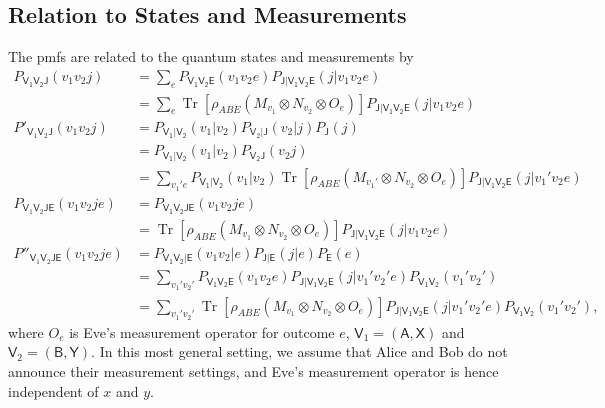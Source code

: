 \documentclass[10pt, a4paper]{article}
\numberwithin{equation}{section} %
\theoremstyle{definition}
\theoremstyle{plain}
\newcommand{\?}{\mathrel{?}} %
\newcommand{\Tr}[2][]{\mathop{\mathrm{Tr}#1}\left[ #2 \right]} %
\newcommand{\crv}[1]{\mathsf{#1}}
\begin{document}
                  \subsection{Relation to States and Measurements}\label{sec:ubound_statemeas}

                  The pmfs are related to the quantum states and measurements by
                  \begin{align}
                    P_{\crv{V_1V_2J}}(v_1v_2j) &= \sum_{e}  P_{\crv{V_1V_2E}}(v_1v_2e) P_{\crv{J|V_1V_2E}}(j|v_1v_2e) \\
                                               &= \sum_{e} \Tr{\rho_{ABE} \left(M_{v_1} \otimes N_{v_2} \otimes O_e\right)} P_{\crv{J|V_1V_2E}}(j|v_1v_2e) \\
                    P'_{\crv{V}_1\crv{V}_2\crv{J}}(v_1v_2j) &= P_{\crv{V_1|V_2}}(v_1|v_2) P_{\crv{V}_2|\crv{J}}(v_2|j) P_{\crv{J}}(j) \\
                                                            &= P_{\crv{V_1|V_2}}(v_1|v_2) P_{\crv{V_2J}}(v_2j) \\
                                                            &= \sum_{v_1' e} P_{\crv{V_1|V_2}}(v_1|v_2) \Tr{\rho_{ABE} \left(M_{v_1'} \otimes N_{v_2} \otimes O_e\right)} P_{\crv{J|V_1V_2E}}(j|v_1'v_2e) \\
                    P_{\crv{V}_1\crv{V}_2\crv{JE}}(v_1v_2je) &= P_{\crv{V_1V_2JE}}(v_1v_2je) \\
                                                             &= \Tr{\rho_{ABE} \left(M_{v_1} \otimes N_{v_2} \otimes O_e\right)} P_{\crv{J|V_1V_2E}}(j|v_1v_2e) \\
                    P''_{\crv{V}_1\crv{V}_2\crv{JE}}(v_1v_2je) &= P_{\crv{V_1V_2|E}}(v_1v_2|e) P_{\crv{J|E}}(j|e) P_{\crv{E}}(e) \\
                                                               &= \sum_{v_1' v_2'} P_{\crv{V_1V_2E}}(v_1v_2e) P_{\crv{J|V_1V_2E}}(j|v_1'v_2'e) P_{\crv{V_1V_2}}(v_1'v_2') \\
                                                               &= \sum_{v_1' v_2'} \Tr{\rho_{ABE} \left(M_{v_1} \otimes N_{v_2} \otimes O_e\right)} P_{\crv{J|V_1V_2E}}(j|v_1'v_2'e) P_{\crv{V_1V_2}}(v_1'v_2'),
                  \end{align}
                  where \(O_e\) is Eve's measurement operator for outcome \(e\), \(\crv{V}_1 = (\crv{A,X})\) and \(\crv{V}_2 = (\crv{B,Y})\). In this most general setting, we assume that Alice and Bob do not announce their measurement settings, and Eve's measurement operator is hence independent of \(x\) and \(y\).
\end{document}
